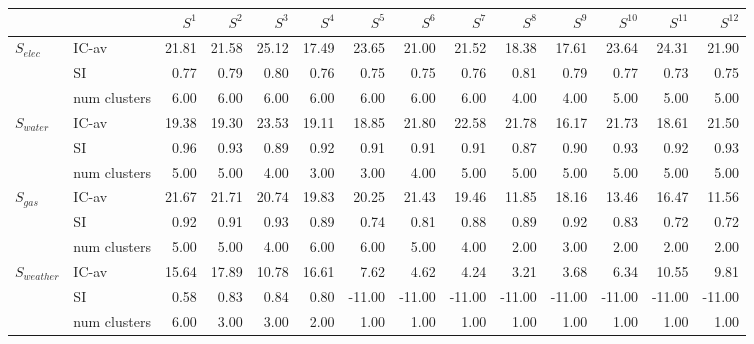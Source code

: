 \begin{tabular}{llrrrrrrrrrrrr}
\toprule
 &  & $S^{1}$ & $S^{2}$ & $S^{3}$ & $S^{4}$ & $S^{5}$ & $S^{6}$ & $S^{7}$ & $S^{8}$ & $S^{9}$ & $S^{10}$ & $S^{11}$ & $S^{12}$ \\
\midrule
\multirow[c]{3}{*}{$S_{elec}$} & IC-av & 21.81 & 21.58 & 25.12 & 17.49 & 23.65 & 21.00 & 21.52 & 18.38 & 17.61 & 23.64 & 24.31 & 21.90 \\
 & SI & 0.77 & 0.79 & 0.80 & 0.76 & 0.75 & 0.75 & 0.76 & 0.81 & 0.79 & 0.77 & 0.73 & 0.75 \\
 & num clusters & 6.00 & 6.00 & 6.00 & 6.00 & 6.00 & 6.00 & 6.00 & 4.00 & 4.00 & 5.00 & 5.00 & 5.00 \\
\multirow[c]{3}{*}{$S_{water}$} & IC-av & 19.38 & 19.30 & 23.53 & 19.11 & 18.85 & 21.80 & 22.58 & 21.78 & 16.17 & 21.73 & 18.61 & 21.50 \\
 & SI & 0.96 & 0.93 & 0.89 & 0.92 & 0.91 & 0.91 & 0.91 & 0.87 & 0.90 & 0.93 & 0.92 & 0.93 \\
 & num clusters & 5.00 & 5.00 & 4.00 & 3.00 & 3.00 & 4.00 & 5.00 & 5.00 & 5.00 & 5.00 & 5.00 & 5.00 \\
\multirow[c]{3}{*}{$S_{gas}$} & IC-av & 21.67 & 21.71 & 20.74 & 19.83 & 20.25 & 21.43 & 19.46 & 11.85 & 18.16 & 13.46 & 16.47 & 11.56 \\
 & SI & 0.92 & 0.91 & 0.93 & 0.89 & 0.74 & 0.81 & 0.88 & 0.89 & 0.92 & 0.83 & 0.72 & 0.72 \\
 & num clusters & 5.00 & 5.00 & 4.00 & 6.00 & 6.00 & 5.00 & 4.00 & 2.00 & 3.00 & 2.00 & 2.00 & 2.00 \\
\multirow[c]{3}{*}{$S_{weather}$} & IC-av & 15.64 & 17.89 & 10.78 & 16.61 & 7.62 & 4.62 & 4.24 & 3.21 & 3.68 & 6.34 & 10.55 & 9.81 \\
 & SI & 0.58 & 0.83 & 0.84 & 0.80 & -11.00 & -11.00 & -11.00 & -11.00 & -11.00 & -11.00 & -11.00 & -11.00 \\
 & num clusters & 6.00 & 3.00 & 3.00 & 2.00 & 1.00 & 1.00 & 1.00 & 1.00 & 1.00 & 1.00 & 1.00 & 1.00 \\
\bottomrule
\end{tabular}
